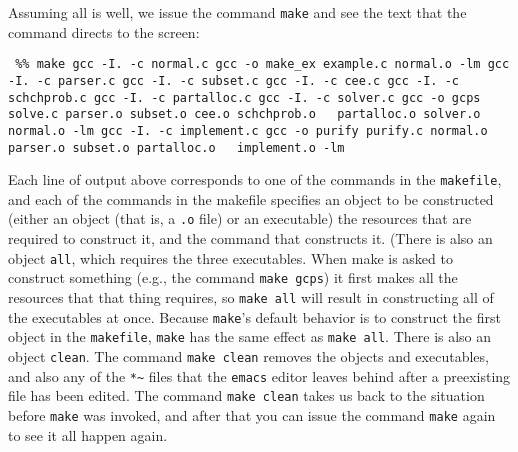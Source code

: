 \documentclass[12pt]{article}
\theoremstyle{definition}
\begin{document}
\begin{appendix}
Assuming all is well, we issue the command \texttt{make} and see the text that the command directs to the screen:
\begin{obeylines}
  \texttt{
    \%\% make
    gcc -I. -c normal.c
    gcc -o make\_ex example.c normal.o -lm
    gcc -I. -c parser.c
    gcc -I. -c subset.c
    gcc -I. -c cee.c
    gcc -I. -c schchprob.c
    gcc -I. -c partalloc.c
    gcc -I. -c solver.c
    gcc -o gcps solve.c parser.o subset.o cee.o schchprob.o
    \ \ partalloc.o solver.o normal.o -lm
    gcc -I. -c implement.c
    gcc -o purify purify.c normal.o parser.o subset.o partalloc.o
    \ \ implement.o -lm
    }
\end{obeylines}
\bigskip
\noindent
Each line of output above corresponds to one of the commands in the
\texttt{makefile}, and each of the commands in the makefile specifies
an object to be constructed (either an object (that is, a \texttt{.o}
file) or an executable) the resources that are required to construct
it, and the command that constructs it.  (There is also an object
\texttt{all}, which requires the three executables.  When make is
asked to construct something (e.g., the command \texttt{make gcps}) it
first makes all the resources that that thing requires, so
\texttt{make all} will result in constructing all of the executables
at once. Because \texttt{make}'s default behavior is to construct the
first object in the \texttt{makefile}, \texttt{make} has the same
effect as \texttt{make all}.  There is also an object \texttt{clean}.
The command \texttt{make clean} removes the objects and executables,
and also any of the \texttt{*\~} files that the \texttt{emacs} editor
leaves behind after a preexisting file has been edited. The command
\texttt{make clean} takes us back to the situation before
\texttt{make} was invoked, and after that you can issue the command
\texttt{make} again to see it all happen again.


\end{appendix}
\end{document}
